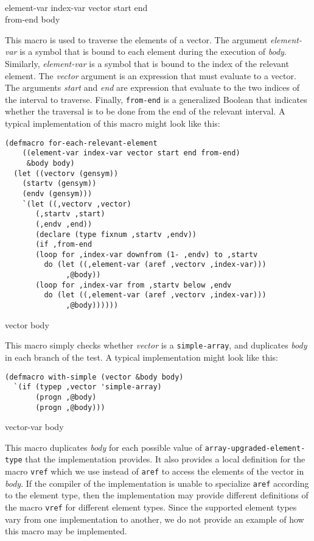 \\
{element-var index-var vector start end\\
from-end \body body}

This macro is used to traverse the elements of a vector.  The argument
\textit{element-var} is a symbol that is bound to each element during
the execution of \textit{body}.  Similarly, \textit{element-var} is a
symbol that is bound to the index of the relevant element.  The
\textit{vector} argument is an expression that must evaluate to a
vector.  The arguments \textit{start} and \textit{end} are expression
that evaluate to the two indices of the interval to traverse.
Finally, \texttt{from-end} is a generalized Boolean that indicates
whether the traversal is to be done from the end of the relevant
interval.  A typical implementation of this macro might look like
this:

{\small\begin{verbatim}
(defmacro for-each-relevant-element
    ((element-var index-var vector start end from-end)
     &body body)
  (let ((vectorv (gensym))
	(startv (gensym))
	(endv (gensym)))
    `(let ((,vectorv ,vector)
	   (,startv ,start)
	   (,endv ,end))
       (declare (type fixnum ,startv ,endv))
       (if ,from-end
	   (loop for ,index-var downfrom (1- ,endv) to ,startv
		 do (let ((,element-var (aref ,vectorv ,index-var)))
		      ,@body))
	   (loop for ,index-var from ,startv below ,endv
		 do (let ((,element-var (aref ,vectorv ,index-var)))
		      ,@body))))))
\end{verbatim}}

 {vector \body body}

This macro simply checks whether \textit{vector} is a
\texttt{simple-array}, and duplicates \textit{body} in each branch of
the test.  A typical implementation might look like this:

{\small\begin{verbatim}
(defmacro with-simple (vector &body body)
  `(if (typep ,vector 'simple-array)
       (progn ,@body)
       (progn ,@body)))
\end{verbatim}}

 {vector-var \body body}

This macro duplicates \textit{body} for each possible value of
\texttt{array-upgraded-element-type} that the implementation provides.
It also provides a local definition for the macro \texttt{vref} which
we use instead of \texttt{aref} to access the elements of the vector
in \textit{body}.  If the compiler of the implementation is unable to
specialize \texttt{aref} according to the element type, then the
implementation may provide different definitions of the macro
\texttt{vref} for different element types.  Since the supported
element types vary from one implementation to another, we do not
provide an example of how this macro may be implemented.
